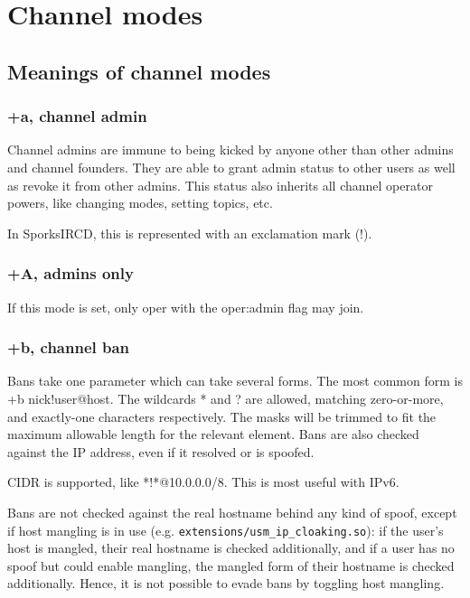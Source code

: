 \chapter{Channel modes}
\label{cmodes}

\section{Meanings of channel modes}

\subsection{+a, channel admin}
	Channel admins are immune to being kicked by anyone other than other
	admins and channel founders.  They are able to grant admin status to
	other users as well as revoke it from other admins.  This status
	also inherits all channel operator powers, like changing modes, setting
	topics, etc.

	In SporksIRCD, this is represented with an exclamation mark (!).

\subsection{+A, admins only}
	If this mode is set, only oper with the oper:admin flag may join.


\subsection{+b, channel ban}
	Bans take one parameter which can take several forms. The most common
	form is +b nick!user@host. The wildcards * and ? are allowed, matching
	zero-{}or-{}more, and exactly-{}one characters respectively. The masks
	will be trimmed to fit the maximum allowable length for the relevant
	element. Bans are also checked against the IP address, even if it
	resolved or is spoofed.

	CIDR is supported, like *!*@10.0.0.0/8. This is most useful with
	IPv6.

	Bans are not checked against the real hostname behind any kind of
	spoof, except if host mangling is in use (e.g.
	\nolinkurl{extensions/usm\_ip\_cloaking.so}): if the user's host is mangled,
	their real hostname is checked additionally, and if a user has no
	spoof but could enable mangling, the mangled form of their hostname is
	checked additionally. Hence, it is not possible to evade bans by
	toggling host mangling.

